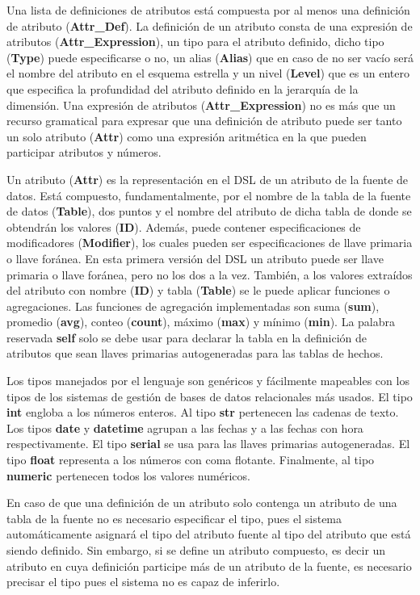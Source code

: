 Una lista de definiciones de atributos est\'a compuesta por al menos una definición de atributo (\textbf{Attr\_Def}). 
La definición de un atributo consta de una expresión de atributos (\textbf{Attr\_Expression}), un tipo para el atributo 
definido, dicho tipo (\textbf{Type}) puede especificarse o no, un alias (\textbf{Alias}) que en caso de no ser vacío ser\'a el nombre del 
atributo en el esquema estrella y un nivel (\textbf{Level}) que es un entero que especifica la profundidad 
del atributo definido en la jerarquía de la dimensión. Una expresión de atributos (\textbf{Attr\_Expression}) no es m\'as que 
un recurso gramatical para expresar que una definición de atributo puede ser tanto un solo atributo (\textbf{Attr})
como una expresión aritmética en la que pueden participar atributos y n\'umeros. 

Un atributo (\textbf{Attr}) es la representación en el DSL de un atributo de la fuente de datos. Est\'a compuesto, 
fundamentalmente, 
por el nombre de la tabla de la fuente de datos (\textbf{Table}), dos puntos y el nombre del atributo de dicha tabla 
de donde se obtendrán los valores (\textbf{ID}). Además, puede contener especificaciones de modificadores (\textbf{Modifier}), 
los cuales pueden ser especificaciones de llave primaria o llave for\'anea. En esta primera versión del 
DSL un atributo puede ser llave primaria o llave for\'anea, pero no los dos a la vez. También, a los valores
extra\'idos del atributo con nombre (\textbf{ID}) y tabla (\textbf{Table}) se le puede aplicar funciones o agregaciones. Las 
funciones de agregación implementadas son suma (\textbf{sum}), promedio (\textbf{avg}), conteo (\textbf{count}), máximo (\textbf{max}) y 
mínimo (\textbf{min}). La palabra reservada \textbf{self} solo se debe usar para declarar la tabla en la definición de atributos 
que sean llaves primarias autogeneradas para las tablas de hechos.

Los tipos manejados por el lenguaje son genéricos y fácilmente mapeables con los tipos de los sistemas de 
gestión de bases de datos relacionales m\'as usados. El tipo \textbf{int} engloba a los n\'umeros enteros. 
Al tipo \textbf{str} pertenecen las cadenas de texto. Los tipos \textbf{date} y \textbf{datetime} agrupan a las fechas y a las fechas con 
hora respectivamente. El tipo \textbf{serial} se usa para las llaves primarias autogeneradas. El tipo \textbf{float} 
representa a los n\'umeros con coma flotante. Finalmente, al tipo \textbf{numeric} pertenecen todos los valores numéricos.

En caso de que una definición de un atributo solo contenga un atributo de una tabla de la fuente no es necesario 
especificar el tipo, pues el sistema automáticamente asignar\'a el tipo del atributo fuente al tipo del 
atributo que est\'a siendo definido. Sin embargo, si se define un atributo compuesto, es decir un atributo en 
cuya definición participe m\'as de un atributo de la fuente, es necesario precisar el tipo pues el sistema 
no es capaz de inferirlo.

